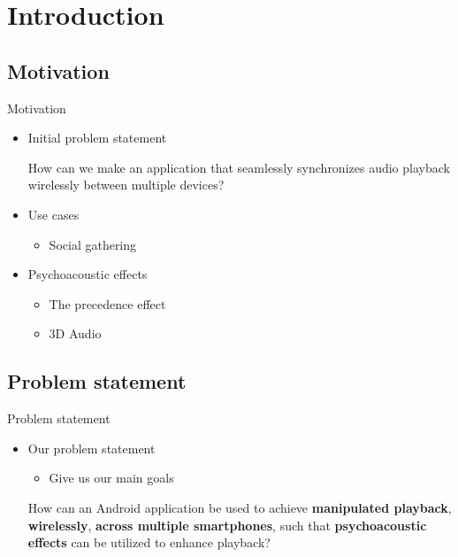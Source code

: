 \section{Introduction}
\author{Thomas}
\subsection{Motivation}

\begin{frame}{Motivation}
    \begin{itemize}
        \item<1-> Initial problem statement

        \begin{problemstatement}
            \scriptsize How can we make an application that seamlessly synchronizes audio playback wirelessly between multiple devices?
        \end{problemstatement}

        \item<2-> Use cases
        \begin{itemize}
            \item<2-> Social gathering
        \end{itemize}
        \item<3-> Psychoacoustic effects
        \begin{itemize}
            \item<3-> The precedence effect
            \item<3-> 3D Audio
        \end{itemize}
    \end{itemize}


\end{frame}

\subsection{Problem statement}
\begin{frame}{Problem statement}

    \begin{itemize}

        \item<1-> Our problem statement
        \begin{itemize}
            \item<1-> Give us our main goals
        \end{itemize}

        \begin{problemstatement}

        \scriptsize How can an Android application be used to achieve \textbf{manipulated playback}, \textbf{wirelessly},
\textbf{across multiple smartphones}, such that \textbf{psychoacoustic effects} can be utilized to enhance playback?
        \end{problemstatement}

    \end{itemize}
\end{frame}

